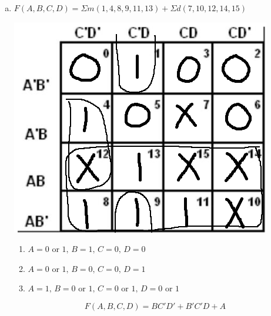 \documentclass[11pt]{article}
\begin{document}
\begin{enumerate}[a)]
    \item 
    $F(A,B,C,D) = \Sigma m(1,4,8,9,11,13) + \Sigma d(7,10,12,14,15)$
    \vspace{-15pt}\begin{center}
        \includegraphics[scale=0.35]{3b.png}
    \end{center}
    \vspace{-20pt}\begin{enumerate}[$\bullet$]
        \item $A = 0$ or $1,\, B = 1,\, C = 0,\, D = 0$
        \item \vspace{-5pt}$A = 0$ or $1,\, B = 0,\, C = 0,\, D = 1$
        \item \vspace{-5pt}$A = 1,\, B = 0$ or $1,\, C = 0$ or $1,\, D = 0$ or $1$
    \end{enumerate}
    $$F(A,B,C,D) = BC'D' + B'C'D + A$$
    \pagebreak


\end{enumerate}
\end{document}

